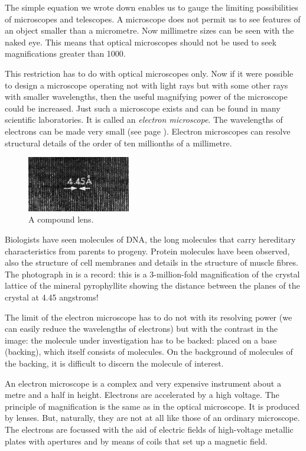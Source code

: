 The simple equation we wrote down enables us to gauge the limiting possibilities of microscopes and telescopes. A microscope does not permit us to see features of an object smaller than a micrometre. Now millimetre sizes can be seen with the naked eye. This means that optical microscopes should not be used to seek magnifications
greater than 1000.

This restriction has to do with optical microscopes only. Now if it were possible to design a microscope oper­ating not with light rays but with some other rays with smaller wavelengths, then the useful magnifying power of the microscope could be increased. Just such a microscope exists and can be found in many scientific laboratories. It is called an \emph{electron microscope}. The wavelengths of electrons can be made very small (see page \pageref{de-broglie-equation}). Electron microscopes can resolve structural details of the order of ten millionths of a millimetre.
\begin{figure}[!ht]
\centering
\includegraphics[width=0.4\textwidth]{figures/fig-02-04.jpg}
\caption{A compound lens.}
\label{fig-2.4}
\end{figure}

Biologists have seen molecules of DNA, the long molecules that carry hereditary characteristics from parents to progeny. Protein molecules have been observed, also the structure of cell membranes and details in the structure of muscle fibres. The photograph in  is a record: this is a 3-million-fold magnification of the crystal lattice of the mineral pyrophyllite showing the distance between the planes of the crystal at 4.45 ang­stroms!

The limit of the electron microscope has to do not with its resolving power (we can easily reduce the wavelengths of electrons) but with the contrast in the image: the molecule under investigation has to be backed: placed on a base (backing), which itself consists of molecules. On the background of molecules of the backing, it is difficult to discern the molecule of interest.

An electron microscope is a complex and very expensive instrument about a metre and a half in height. Electrons are accelerated by a high voltage. The principle of magnification is the same as in the optical microscope. It is produced by lenses. But, naturally, they are not at all like those of an ordinary microscope. The electrons are focussed with the aid of electric fields of high-voltage metallic plates with apertures and by means of coils that set up a magnetic field.

